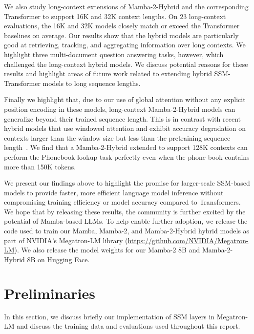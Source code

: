 We also study long-context extensions of Mamba-2-Hybrid and the corresponding Transformer to support 16K and 32K context lengths. On 23 long-context evaluations, the 16K and 32K models closely match or exceed the Transformer baselines on average. Our results show that the hybrid models are particularly good at retrieving, tracking, and aggregating information over long contexts. We highlight three multi-document question answering tasks, however, which challenged the long-context hybrid models. We discuss potential reasons for these results and highlight areas of future work related to extending hybrid SSM-Transformer models to long sequence lengths.

Finally we highlight that, due to our use of global attention without any explicit position encoding in these models, long-context Mamba-2-Hybrid models can generalize beyond their trained sequence length. This is in contrast with recent hybrid models that use windowed attention and exhibit accuracy degradation on contexts larger than the window size but less than the pretraining sequence length~\citep{de2024griffin}. We find that a Mamba-2-Hybrid extended to support 128K contexts can perform the Phonebook lookup task perfectly even when the phone book contains more than 150K tokens.

We present our findings above to highlight the promise for larger-scale SSM-based models to provide faster, more efficient language model inference without compromising training efficiency or model accuracy compared to Transformers. We hope that by releasing these results, the community is further excited by the potential of Mamba-based LLMs. To help enable further adoption, we release the code used to train our Mamba, Mamba-2, and Mamba-2-Hybrid hybrid models as part of NVIDIA's Megatron-LM library (\href{Megatron}{https://github.com/NVIDIA/Megatron-LM}).
We also release the model weights for our Mamba-2 8B and Mamba-2-Hybrid 8B on Hugging Face.

\section{Preliminaries}
\label{sec:preliminaries}
In this section, we discuss briefly our implementation of SSM layers in Megatron-LM and discuss the training data and evaluations used throughout this report.

